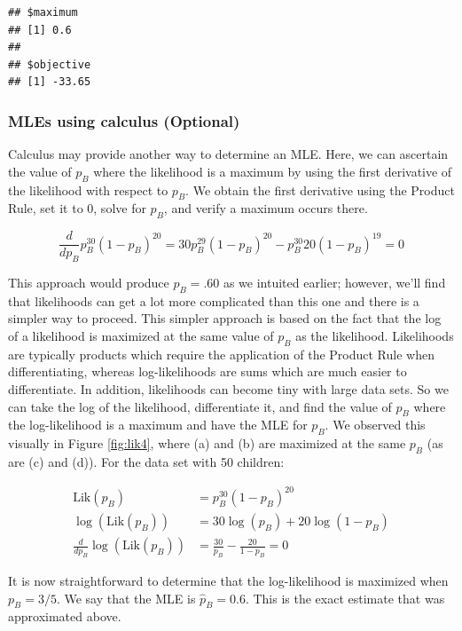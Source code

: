 \documentclass[
]{krantz}
\newcommand{\lik}{\mathrm{Lik}}
\begin{document}
\begin{verbatim}
## $maximum
## [1] 0.6
## 
## $objective
## [1] -33.65
\end{verbatim}

\hypertarget{calc-sec}{%
\subsubsection{MLEs using calculus (Optional)}\label{calc-sec}}

Calculus may provide another way to determine an MLE. Here, we can ascertain the value of \(p_B\) where the likelihood is a maximum by using the first derivative of the likelihood with respect to \(p_B\). We obtain the first derivative using the Product Rule, set it to 0, solve for \(p_B\), and verify a maximum occurs there.

\begin{equation*}
\frac{d}{dp_B}p_B^{30}(1-p_B)^{20} = 30p_B^{29}(1-p_B)^{20}-p^{30}_B20(1-p_B)^{19} = 0
\end{equation*}

This approach would produce \(p_B = .60\) as we intuited earlier; however, we'll find that likelihoods can get a lot more complicated than this one and there is a simpler way to proceed. This simpler approach is based on the fact that the log of a likelihood is maximized at the same value of \(p_B\) as the likelihood. Likelihoods are typically products which require the application of the Product Rule when differentiating, whereas log-likelihoods are sums which are much easier to differentiate. In addition, likelihoods can become tiny with large data sets. So we can take the log of the likelihood, differentiate it, and find the value of \(p_B\) where the log-likelihood is a maximum and have the MLE for \(p_B\). We observed this visually in Figure \ref{fig:lik4}, where (a) and (b) are maximized at the same \(p_B\) (as are (c) and (d)). For the data set with 50 children:

\begin{align*}
 \lik(p_B)                      &= p_B^{30}(1-p_B)^{20} \\
 \log(\lik(p_B))                &= 30\log(p_B)+20\log(1-p_B) \\
 \frac{d}{dp_B} \log(\lik(p_B)) &= \frac{30}{p_B} - \frac{20}{1-p_B} = 0
 \label{eq:dlogLik50}
\end{align*}

It is now straightforward to determine that the log-likelihood is maximized when \(p_B = 3/5.\) We say that the MLE is \(\hat{p}_B = 0.6\). This is the exact estimate that was approximated above.
\end{document}
